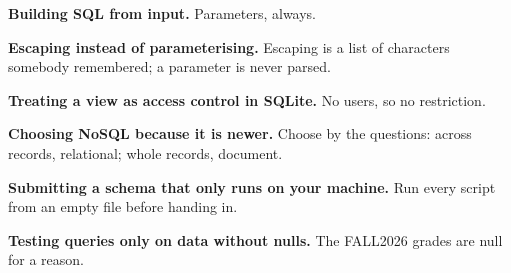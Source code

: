 \begin{pitfall}
\begin{tight}
  \item \textbf{Building SQL from input.} Parameters, always.
  \item \textbf{Escaping instead of parameterising.} Escaping is a list of
        characters somebody remembered; a parameter is never parsed.
  \item \textbf{Treating a view as access control in SQLite.} No users, so no
        restriction.
  \item \textbf{Choosing NoSQL because it is newer.} Choose by the questions:
        across records, relational; whole records, document.
  \item \textbf{Submitting a schema that only runs on your machine.} Run every
        script from an empty file before handing in.
  \item \textbf{Testing queries only on data without nulls.} The FALL2026
        grades are null for a reason.
\end{tight}
\end{pitfall}

